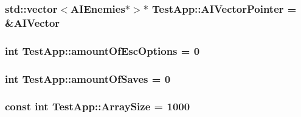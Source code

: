 \subsubsection[{\texorpdfstring{A\+I\+Vector\+Pointer}{AIVectorPointer}}]{\setlength{\rightskip}{0pt plus 5cm}std\+::vector$<${\bf A\+I\+Enemies}$\ast$$>$$\ast$ Test\+App\+::\+A\+I\+Vector\+Pointer = \&{\bf A\+I\+Vector}\hspace{0.3cm}{\ttfamily [protected]}}\hypertarget{classTestApp_ac409d674f567c5d2ea773bd7ec3036d9}{}\label{classTestApp_ac409d674f567c5d2ea773bd7ec3036d9}
\subsubsection[{\texorpdfstring{amount\+Of\+Esc\+Options}{amountOfEscOptions}}]{\setlength{\rightskip}{0pt plus 5cm}int Test\+App\+::amount\+Of\+Esc\+Options = 0\hspace{0.3cm}{\ttfamily [protected]}}\hypertarget{classTestApp_a06f690797d69d08919e18257301b4e04}{}\label{classTestApp_a06f690797d69d08919e18257301b4e04}
\subsubsection[{\texorpdfstring{amount\+Of\+Saves}{amountOfSaves}}]{\setlength{\rightskip}{0pt plus 5cm}int Test\+App\+::amount\+Of\+Saves = 0\hspace{0.3cm}{\ttfamily [protected]}}\hypertarget{classTestApp_aa71d097d6dc89a017be31826983e24d3}{}\label{classTestApp_aa71d097d6dc89a017be31826983e24d3}
\subsubsection[{\texorpdfstring{Array\+Size}{ArraySize}}]{\setlength{\rightskip}{0pt plus 5cm}const int Test\+App\+::\+Array\+Size = 1000\hspace{0.3cm}{\ttfamily [protected]}}\hypertarget{classTestApp_a980934e42fe32913bde240b0e68431dd}{}\label{classTestApp_a980934e42fe32913bde240b0e68431dd}
